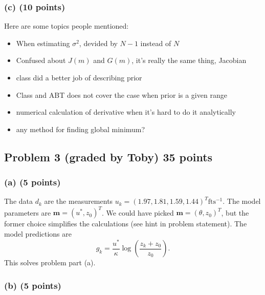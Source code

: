 \documentclass[11pt]{article}
\begin{document}
\subsubsection*{(c) (10 points)}
Here are some topics people mentioned:
\begin{itemize}
\item When estimating $\sigma^2$, devided by $N-1$ instead of $N$
\item Confused about $J(m)$ and $G(m)$, it's really the same thing, Jacobian 
\item class did a better job of describing prior
\item Class and ABT does not cover the case when prior is a given range
\item numerical calculation of derivative when it's hard to do it analytically
\item any method for finding global minimum?
\end{itemize}


\subsection*{Problem 3 (graded by Toby) 35 points}

\subsubsection*{(a) (5 points)}

The data $d_k$ are the measurements $u_k = (1.97, 1.81, 1.59, 1.44)^T \mathrm{ft s^{-1}}$. The model parameters are $\mathbf{m} = (u^*, z_0)^T$. We could have picked $\mathbf{m} = (\theta, z_0)^T$, but the former choice simplifies the calculations (see hint in problem statement). The model predictions are
\begin{equation}
g_k = \frac{u^*}{\kappa} \log \left( \frac{z_k+z_0}{z_0} \right).
\end{equation}
This solves problem part (a).

\subsubsection*{(b) (5 points)}
\end{document}
